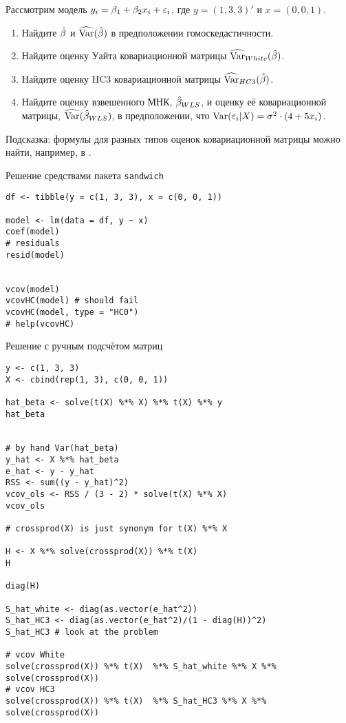\begin{problem}
Рассмотрим модель $y_i=\beta_1 + \beta_2 x_i + \varepsilon_i$, где $y=(1,3,3)'$ и $x=(0,0,1)$.
\begin{enumerate}
\item Найдите $\hat{\beta}$ и $\widehat{\operatorname{Var}}(\hat{\beta})$ в предположении гомоскедастичности.
\item Найдите оценку Уайта ковариационной матрицы $\widehat{\operatorname{Var}}_{White}(\hat{\beta})$.
\item Найдите оценку HC3 ковариационной матрицы $\widehat{\operatorname{Var}}_{HC3}(\hat{\beta})$.
\item Найдите оценку взвешенного МНК, $\hat{\beta}_{WLS}$, и оценку её ковариационной матрицы, $\widehat{\operatorname{Var}}(\hat{\beta}_{WLS})$, в предположении, что $\operatorname{Var}(\varepsilon_i|X)=\sigma^2 \cdot ( 4 + 5x_i)$.
\end{enumerate}

Подсказка: формулы для разных типов оценок ковариационной матрицы можно найти, например, в \cite{zeileis2004econometric}.

\begin{sol}
Решение средствами пакета \verb|sandwich|
\begin{verbatim}
df <- tibble(y = c(1, 3, 3), x = c(0, 0, 1))

model <- lm(data = df, y ~ x)
coef(model)
# residuals
resid(model)


vcov(model)
vcovHC(model) # should fail
vcovHC(model, type = "HC0")
# help(vcovHC)
\end{verbatim}

Решение с ручным подсчётом матриц
\begin{verbatim}
y <- c(1, 3, 3)
X <- cbind(rep(1, 3), c(0, 0, 1))

hat_beta <- solve(t(X) %*% X) %*% t(X) %*% y
hat_beta


# by hand Var(hat_beta)
y_hat <- X %*% hat_beta
e_hat <- y - y_hat
RSS <- sum((y - y_hat)^2)
vcov_ols <- RSS / (3 - 2) * solve(t(X) %*% X)
vcov_ols

# crossprod(X) is just synonym for t(X) %*% X

H <- X %*% solve(crossprod(X)) %*% t(X)
H

diag(H)

S_hat_white <- diag(as.vector(e_hat^2))
S_hat_HC3 <- diag(as.vector(e_hat^2)/(1 - diag(H))^2)
S_hat_HC3 # look at the problem

# vcov White
solve(crossprod(X)) %*% t(X)  %*% S_hat_white %*% X %*% solve(crossprod(X))
# vcov HC3
solve(crossprod(X)) %*% t(X)  %*% S_hat_HC3 %*% X %*% solve(crossprod(X))
\end{verbatim}

\end{sol}
\end{problem}



